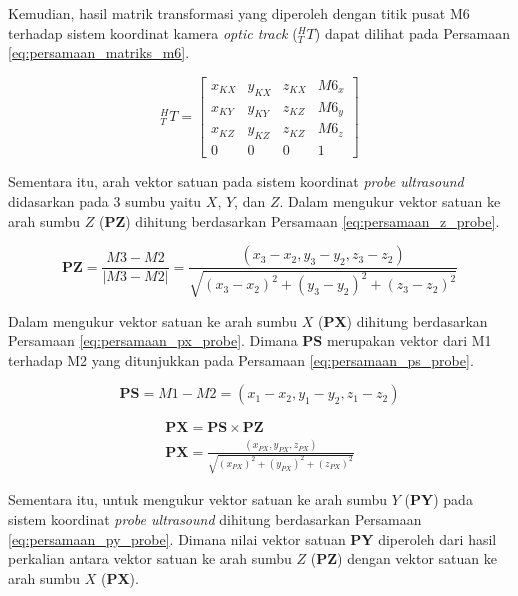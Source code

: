 Kemudian, hasil matrik transformasi yang diperoleh dengan titik pusat M6 terhadap sistem koordinat kamera \textit{optic track} (${_T^H}T$) dapat dilihat pada Persamaan \ref{eq:persamaan_matriks_m6}.

\begin{equation}
	{_T^H}T = \begin{bmatrix}x_{KX} & y_{KX} & z_{KX} & M6_x  \\x_{KY} & y_{KY} & z_{KZ} & M6_y \\x_{KZ} & y_{KZ} & z_{KZ} & M6_z \\0 & 0 & 0 & 1 \end{bmatrix}	
	\label{eq:persamaan_matriks_m6}
\end{equation}

Sementara itu, arah vektor satuan pada sistem koordinat \textit{probe ultrasound} didasarkan pada 3 sumbu yaitu $X$, $Y$, dan $Z$. Dalam mengukur vektor satuan ke arah sumbu $Z$ (\textbf{PZ}) dihitung berdasarkan Persamaan \ref{eq:persamaan_z_probe}.

\begin{equation}
	\textbf{PZ} = \frac{M3 - M2}{\left|M3 - M2 \right|} = \frac{(x_3-x_2, y_3 - y_2, z_3 - z_2)}{\sqrt{{(x_3 - x_2)^2 + (y_3 - y_2)^2 + (z_3 - z_2)^2 }}}
	\label{eq:persamaan_z_probe}
\end{equation} 

Dalam mengukur vektor satuan ke arah sumbu $X$ (\textbf{PX}) dihitung berdasarkan Persamaan \ref{eq:persamaan_px_probe}. Dimana \textbf{PS} merupakan vektor dari M1 terhadap M2 yang ditunjukkan pada Persamaan \ref{eq:persamaan_ps_probe}.

\begin{equation}
	\textbf{PS} = M1 - M2 = (x_1 - x_2, y_1 - y_2, z_1 - z_2)
	\label{eq:persamaan_ps_probe}
\end{equation}

\begin{equation}
	\begin{align}
		\textbf{PX} = \textbf{PS} \times \textbf{PZ}\\[10pt]
		\textbf{PX} = \frac{(x_{PX}, y_{PX}, z_{PX})}{\sqrt{{(x_{PX})^2 + (y_{PX})^2 + (z_{PX})^2}}}
	\end{align}
	\label{eq:persamaan_px_probe}
\end{equation}

Sementara itu, untuk mengukur vektor satuan ke arah sumbu $Y$ (\textbf{PY}) pada sistem koordinat \textit{probe ultrasound} dihitung berdasarkan Persamaan \ref{eq:persamaan_py_probe}. Dimana nilai vektor satuan \textbf{PY} diperoleh dari hasil perkalian antara vektor satuan ke arah sumbu $Z$ (\textbf{PZ}) dengan vektor satuan ke arah sumbu $X$ (\textbf{PX}).

